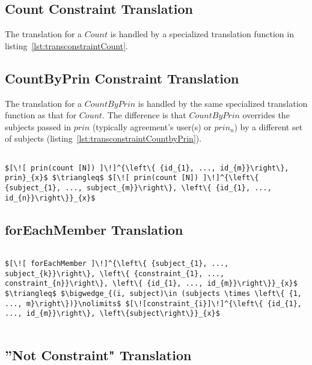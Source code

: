 \subsection{Count Constraint Translation}
The translation for a $Count$ is handled by a specialized translation function in listing~\ref{lst:transconstraintCount}. 


\subsection{CountByPrin Constraint Translation}
The translation for a $CountByPrin$ is handled by the same specialized translation function as that for $Count$. The difference is that $CountByPrin$ overrides the subjects passed in $prin$ (typically agreement's user(s) or $prin_{u}$) by a different set of subjects (listing~\ref{lst:transconstraintCountbyPrin}).

\lstset{mathescape, language=AST}  
\begin{lstlisting}[frame=single, caption={Constraint Translation {$\colon$} Count by Principal},label={lst:transconstraintCountbyPrin}]

$[\![ prin(count [N]) ]\!]^{\left\{ {id_{1}, ..., id_{m}}\right\}, prin}_{x}$ $\triangleq$ $[\![ prin(count [N]) ]\!]^{\left\{ {subject_{1}, ..., subject_{m}}\right\}, \left\{ {id_{1}, ..., id_{n}}\right\}}_{x}$ 
\end{lstlisting}


\subsection{forEachMember Translation}

\lstset{mathescape, language=AST}  
\begin{lstlisting}[frame=single, caption={ForEachMember Translation {$\colon$} Count by Principal},label={lst:transforEachMember}]

$[\![ forEachMember ]\!]^{\left\{ {subject_{1}, ..., subject_{k}}\right\}, \left\{ {constraint_{1}, ..., constraint_{n}}\right\}, \left\{ {id_{1}, ..., id_{m}}\right\}}_{x}$ $\triangleq$ $\bigwedge_{(i, subject)\in (subjects \times \left\{ {1, ..., m}\right\})}\nolimits$ $[\![constraint_{i}]\!]^{\left\{ {id_{1}, ..., id_{m}}\right\}, \left\{subject\right\}}_{x}$


\end{lstlisting}

\subsection{''Not Constraint" Translation}


